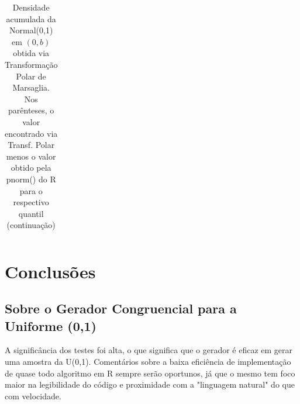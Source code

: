 \documentclass[
	article,			%
	12pt,				%
	twoside,			%
	a4paper,			%
	english,			%
	brazil,				%
	]{abntex2}
\begin{document}
\begin{landscape}
\begin{table}
\begin{tabular}{c||p{18mm}|p{18mm}|p{18mm}|p{18mm}|p{18mm}|p{18mm}|p{18mm}|p{18mm}|p{18mm}|p{18mm}|p{18mm}|p{18mm}|p{18mm}|p{18mm}|p{18mm}|p{18mm}|p{18mm}}
\end{tabular}
\caption{Densidade acumulada da Normal(0,1) em $(0,b)$ obtida via Transformação Polar de Marsaglia. Nos parênteses, o valor encontrado via Transf. Polar menos o valor obtido pela pnorm() do R para o respectivo quantil (continuação)}

\end{table}
        	\end{landscape}
        	
\section{Conclusões}
\subsection{Sobre o Gerador Congruencial para a Uniforme (0,1)}
	A significância dos testes foi alta, o que significa que o gerador é eficaz em gerar uma amostra da U(0,1). Comentários sobre a baixa eficiência de implementação de quase todo algoritmo em R sempre serão oportunos, já que o mesmo tem foco maior na legibilidade do código e proximidade com a "linguagem natural" do que com velocidade. 
\end{document}
